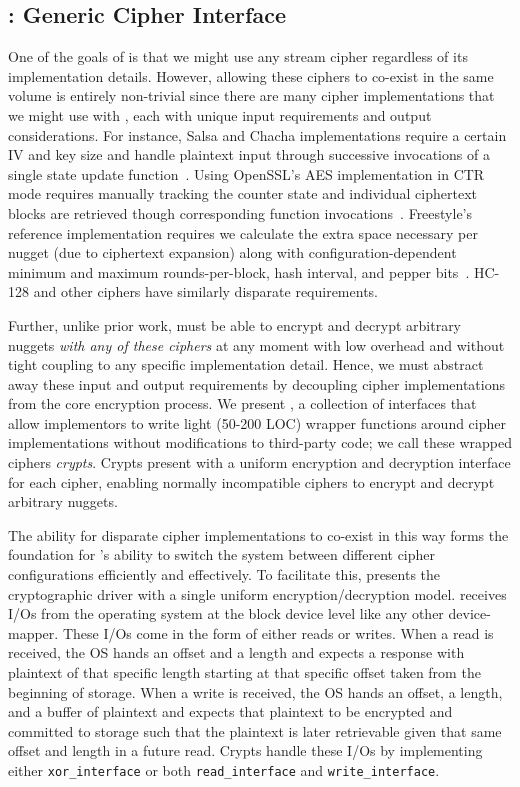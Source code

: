 \subsection{\sysB: Generic Cipher Interface}\label{subsec:des-crypts}

One of the goals of \sys is that we might use any stream cipher regardless of
its implementation details. However, allowing these ciphers to co-exist in the
same volume is entirely non-trivial since there are many cipher implementations
that we might use with \sys, each with unique input requirements and output
considerations. For instance, Salsa and Chacha implementations require a certain
IV and key size and handle plaintext input through successive invocations of a
single state update function~\cite{Floodyberry}. Using OpenSSL's AES
implementation in CTR mode requires manually tracking the counter state and
individual ciphertext blocks are retrieved though corresponding function
invocations~\cite{OpenSSL}. Freestyle's reference implementation requires we
calculate the extra space necessary per nugget (due to ciphertext expansion)
along with configuration-dependent minimum and maximum rounds-per-block, hash
interval, and pepper bits~\cite{Freestyle}. HC-128 and other ciphers have
similarly disparate requirements.

Further, unlike prior work, \sys must be able to encrypt and decrypt arbitrary
nuggets \emph{with any of these ciphers} at any moment with low overhead and
without tight coupling to any specific implementation detail. Hence, we must
abstract away these input and output requirements by decoupling cipher
implementations from the core encryption process. We present \sysB, a collection
of interfaces that allow implementors to write light (50-200 LOC) wrapper
functions around cipher implementations without modifications to third-party
code; we call these wrapped ciphers {\em crypts}. Crypts present \sys with a
uniform encryption and decryption interface for each cipher, enabling normally
incompatible ciphers to encrypt and decrypt arbitrary nuggets.

The ability for disparate cipher implementations to co-exist in this way forms
the foundation for \sys's ability to switch the system between different cipher
configurations efficiently and effectively. To facilitate this, \sysB presents
the cryptographic driver with a single uniform encryption/decryption model. \sys
receives I/Os from the operating system at the block device level like any other
device-mapper. These I/Os come in the form of either reads or writes. When a
read is received, the OS hands \sys an offset and a length and expects a
response with plaintext of that specific length starting at that specific offset
taken from the beginning of storage. When a write is received, the OS hands \sys
an offset, a length, and a buffer of plaintext and expects that plaintext to be
encrypted and committed to storage such that the plaintext is later retrievable
given that same offset and length in a future read. Crypts handle these I/Os by
implementing either \texttt{xor\_interface} or both \texttt{read\_interface} and
\texttt{write\_interface}.

